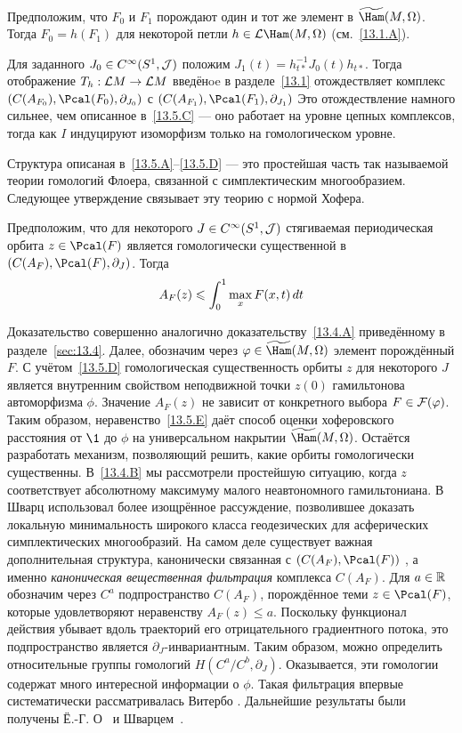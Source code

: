 \begin{ex}{}\label{13.5.D}
Предположим, что $F_{0}$ и $F_{1}$ порождают один и тот же элемент в
$\widetilde\Ham(M,\Omega)$. 
Тогда $F_{0} = h(F_{1})$ для некоторой петли $h\z\in\L\Ham(M,\Omega)$
(см.~\ref{13.1.A}).
\end{ex}

Для заданного $J_{0}\in C^{\infty}(S^{1},\mathcal{J})$ положим
$J_{1}(t)=h_{t*}^{-1}J_{0}(t)h_{t*}$. Тогда отображение $T_{h}:\mathcal{L}
M\to\mathcal{L} M$ введёнoe в разделе~\ref{13.1} отождествляет
комплекс $(C(A_{F_{0}}),\Pcal(F_{0}),\partial_{J_{0}})$ с
$(C(A_{F_{1}}),\Pcal(F_{1}),\partial_{J_{1}})$ 
Это отождествление намного сильнее, чем описанное в~\ref{13.5.C}
— оно работает на уровне цепных комплексов, тогда как $I$ индуцируют
изоморфизм только на гомологическом уровне. 

\medskip
Структура описаная в~\ref{13.5.A}--\ref{13.5.D} --- это простейшая
часть так называемой теории гомологий 
Флоера, связанной с симплектическим многообразием. 
Следующее утверждение связывает эту теорию с нормой Хофера.

\begin{ex}{}\label{13.5.E}
Предположим, что для некоторого $J\in C^{\infty}(S^{1},\mathcal{J})$
стягиваемая периодическая орбита $z\in\Pcal(F)$ является гомологически
существенной в $(C(A_{F}),\Pcal(F),\partial_{J})$. Тогда
\[
A_{F}(z)\leqslant\int_{0}^{1}\max_{x}F(x,t)\,d t
\]
\end{ex}

Доказательство совершенно аналогично доказательству~\ref{13.4.A}
приведённому в разделе~\ref{sec:13.4}.
Далее, обозначим через $\phi\in\widetilde\Ham(M,\Omega)$ элемент порождённый $F$.
С учётом~\ref{13.5.D} гомологическая
существенность орбиты $z$ для некоторого $J$ является внутренним свойством
неподвижной точки $z(0)$ гамильтонова автоморфизма $\phi$.
Значение $A_{F}(z)$ не зависит от конкретного выбора $F\in\mathcal{F}(\varphi)$.
Таким образом, неравенство~\ref{13.5.E} даёт способ оценки хоферовского расстояния от $\1$ до $\phi$ на универсальном накрытии $\widetilde\Ham(M,\Omega)$.
Остаётся разработать механизм, позволяющий решить, какие орбиты
гомологически существенны. 
В~\ref{13.4.B} мы рассмотрели простейшую ситуацию, когда $z$ соответствует абсолютному максимуму малого неавтономного гамильтониана. 
В~\cite{Sch3} Шварц использовал более изощрённое
рассуждение, позволившее доказать локальную минимальность широкого
класса геодезических для асферических симплектических многообразий.  
На самом деле существует важная дополнительная структура,
канонически связанная с $(C(A_{F}),\Pcal(F))$
, а именно
\textit{каноническая вещественная фильтрация} комплекса $C(A_{F})$.
Для $a\in\mathbb{R}$ обозначим через $C^{a}$ подпространство $C(A_{F})$,
порождённое теми $z\in\Pcal(F)$, которые удовлетворяют неравенству
$A_{F}(z)\le a$.
Поскольку функционал действия убывает вдоль траекторий его
отрицательного градиентного потока, это подпространство является
$\partial_{J}$-инвариантным. 
Таким образом, можно определить относительные группы гомологий
$H(C^{a}/C^{b},\partial_{J})$.
Оказывается, эти гомологии содержат много интересной информации о $\phi$.
Такая фильтрация впервые систематически рассматривалась Витербо \cite{V1}.
Дальнейшие результаты были получены Ё.-Г. О~\cite{O4} и Шварцем~\cite{Sch3}.

